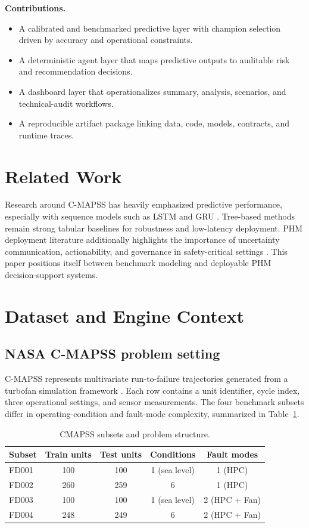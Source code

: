\documentclass[11pt]{article}
\begin{document}
\textbf{Contributions.}
\begin{itemize}
  \item A calibrated and benchmarked predictive layer with champion selection driven by accuracy and operational constraints.
  \item A deterministic agent layer that maps predictive outputs to auditable risk and recommendation decisions.
  \item A dashboard layer that operationalizes summary, analysis, scenarios, and technical-audit workflows.
  \item A reproducible artifact package linking data, code, models, contracts, and runtime traces.
\end{itemize}

\section{Related Work}
Research around C-MAPSS has heavily emphasized predictive performance, especially with sequence models such as LSTM and GRU \cite{ramasso2014prognostics,zheng2017lstm}. Tree-based methods remain strong tabular baselines for robustness and low-latency deployment. PHM deployment literature additionally highlights the importance of uncertainty communication, actionability, and governance in safety-critical settings \cite{sikorska2011prognostic,lee2014service}. This paper positions itself between benchmark modeling and deployable PHM decision-support systems.

\section{Dataset and Engine Context}
\subsection{NASA C-MAPSS problem setting}
C-MAPSS represents multivariate run-to-failure trajectories generated from a turbofan simulation framework \cite{nasa_cmapss_guide}. Each row contains a unit identifier, cycle index, three operational settings, and sensor measurements. The four benchmark subsets differ in operating-condition and fault-mode complexity, summarized in Table~\ref{tab:cmapss_subsets}.

\begin{table}[H]
\centering
\caption{CMAPSS subsets and problem structure.}
\label{tab:cmapss_subsets}
\begin{tabular}{lcccc}
\toprule
Subset & Train units & Test units & Conditions & Fault modes \\
\midrule
FD001 & 100 & 100 & 1 (sea level) & 1 (HPC) \\
FD002 & 260 & 259 & 6 & 1 (HPC) \\
FD003 & 100 & 100 & 1 (sea level) & 2 (HPC + Fan) \\
FD004 & 248 & 249 & 6 & 2 (HPC + Fan) \\
\bottomrule
\end{tabular}
\end{table}
\end{document}
